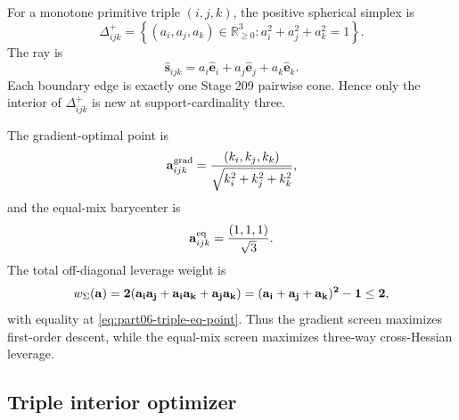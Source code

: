 For a monotone primitive triple \((i,j,k)\), the positive spherical simplex is
\begin{equation}
\label{eq:part06-triple-simplex}
\Delta_{ijk}^{+}
=
\left\{(a_i,a_j,a_k)\in\mathbb R_{\ge0}^{3}:a_i^2+a_j^2+a_k^2=1\right\}.
\end{equation}
The ray is
\begin{equation}
\label{eq:part06-triple-ray}
\widehat{\mathbf s}_{ijk}=a_i\widehat{\mathbf e}_i+a_j\widehat{\mathbf e}_j+a_k\widehat{\mathbf e}_k.
\end{equation}
Each boundary edge is exactly one Stage 209 pairwise cone.  Hence only the interior of \(\Delta_{ijk}^{+}\) is new at support-cardinality three.

The gradient-optimal point is
\begin{equation}
\label{eq:part06-triple-grad-point}
\mathbf a_{ijk}^{\rm grad}
=
\frac{(k_i,k_j,k_k)}{\sqrt{k_i^2+k_j^2+k_k^2}},
\end{equation}
and the equal-mix barycenter is
\begin{equation}
\label{eq:part06-triple-eq-point}
\mathbf a_{ijk}^{\rm eq}=\frac{(1,1,1)}{\sqrt3}.
\end{equation}
The total off-diagonal leverage weight is
\begin{equation}
\label{eq:part06-triple-cross-leverage}
w_\Sigma(\bf a)=2(a_ia_j+a_ia_k+a_ja_k)=(a_i+a_j+a_k)^2-1\le2,
\end{equation}
with equality at \eqref{eq:part06-triple-eq-point}.  Thus the gradient screen maximizes first-order descent, while the equal-mix screen maximizes three-way cross-Hessian leverage.

\subsection{Triple interior optimizer}
\label{subsec:part06-triple-interior-optimizer}

